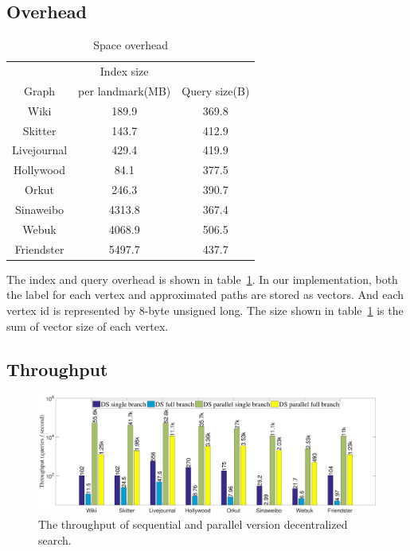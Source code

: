 \subsection{Overhead}
\label{eval_overhead}

\begin{table}
		\vspace{-0.5cm}
		\caption{Space overhead}
    \label{table:ioh}
    \centering
    \begin{tabular}{c|cc} \hline
				&Index size&\\
				Graph&per landmark(MB)&Query size(B)\\ \hline
				Wiki&189.9&369.8 \\ 
				Skitter&143.7&412.9 \\ 
				Livejournal&429.4&419.9 \\ 
				Hollywood&84.1&377.5 \\ 
				Orkut&246.3&390.7 \\ 
				Sinaweibo&4313.8&367.4 \\ 
				Webuk&4068.9&506.5 \\ 
				Friendster&5497.7&437.7 \\ \hline
    \end{tabular}
		\vspace{-0.3cm}
\end{table}

The index and query overhead is shown in table~\ref{table:ioh}. In our implementation, both the label for each vertex and approximated paths are stored as vectors. And each vertex id is represented by 8-byte unsigned long. The size shown in table~\ref{table:ioh} is the sum of vector size of each vertex. 

\subsection{Throughput}
\label{eval_throughput}

\begin{figure}[ht]
		\vspace{-0.5cm}
    \centering
    \includegraphics[width=0.95\linewidth]{./figures/throughput.pdf}
    \caption{The throughput of sequential and parallel version decentralized search.}
    \label{fig:throughput}
		\vspace{-0.5cm}
\end{figure}

